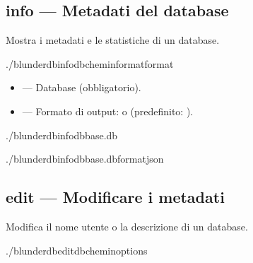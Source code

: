 \documentclass[letterpaper,10pt,italian]{sphinxmanual}
\begin{document}
\subsection{info — Metadati del database}
\label{\detokenize{cli:info-metadonnees-de-la-base}}
\sphinxAtStartPar
Mostra i metadati e le statistiche di un database.

\begin{sphinxVerbatim}[commandchars=\\\{\}]
./blunderdbinfo\PYGZhy{}\PYGZhy{}db\PYGZlt{}chemin\PYGZgt{}\PYG{o}{[}\PYGZhy{}\PYGZhy{}format\PYGZlt{}format\PYGZgt{}\PYG{o}{]}
\end{sphinxVerbatim}

\sphinxAtStartPar
{}
\begin{itemize}
\item {} 
\sphinxAtStartPar
{} — Database (obbligatorio).

\item {} 
\sphinxAtStartPar
{} — Formato di output:  o  (predefinito: ).

\end{itemize}

\sphinxAtStartPar
{}

\begin{sphinxVerbatim}[commandchars=\\\{\}]
./blunderdbinfo\PYGZhy{}\PYGZhy{}dbbase.db

./blunderdbinfo\PYGZhy{}\PYGZhy{}dbbase.db\PYGZhy{}\PYGZhy{}formatjson
\end{sphinxVerbatim}


\subsection{edit — Modificare i metadati}
\label{\detokenize{cli:edit-modifier-les-metadonnees}}
\sphinxAtStartPar
Modifica il nome utente o la descrizione di un database.

\begin{sphinxVerbatim}[commandchars=\\\{\}]
./blunderdbedit\PYGZhy{}\PYGZhy{}db\PYGZlt{}chemin\PYGZgt{}\PYG{o}{[}options\PYG{o}{]}
\end{sphinxVerbatim}
\end{document}

